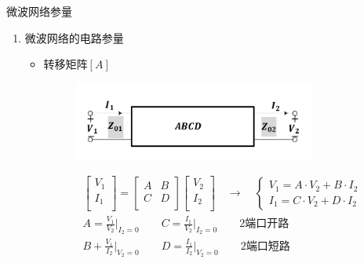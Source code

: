 \begin{frame}{微波网络参量}
    \begin{enumerate}
        \item 微波网络的电路参量
              \begin{itemize}
                  \item 转移矩阵$[A]$
                        \begin{figure}
                            \includegraphics[width=8cm]{Cha5//fig5-8.pdf}
                        \end{figure}
                        \begin{gather*}
                            \begin{bmatrix*}
                                V_1 \\
                                I_1 \\
                            \end{bmatrix*}
                            =
                            \begin{bmatrix*}
                                A & B \\
                                C & D \\
                            \end{bmatrix*}
                            \begin{bmatrix*}
                                V_2 \\
                                I_2 \\
                            \end{bmatrix*}\quad\rightarrow\quad
                            \begin{cases}
                                V_1=A\cdot V_2+B\cdot I_2 \\
                                I_1=C\cdot V_2+D\cdot I_2
                            \end{cases}\\
                            A=\frac{V_1}{V_2}\bigg|_{I_2=0}\qquad C=\frac{I_1}{V_2}\bigg|_{I_2=0}\qquad 2端口开路\\
                            B+\frac{V_1}{I_2}\bigg|_{V_2=0}\qquad D=\frac{I_1}{I_2}\bigg|_{V_2=0}\qquad 2端口短路
                        \end{gather*}
              \end{itemize}
    \end{enumerate}
\end{frame}

